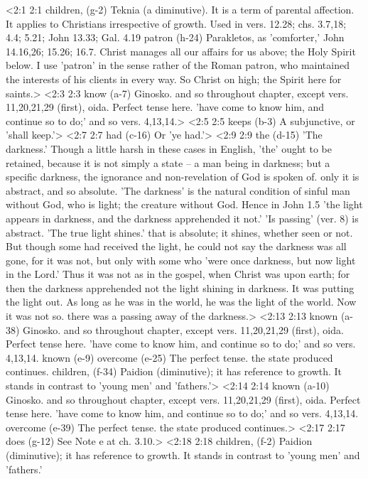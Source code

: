 <2:1 2:1  children, (g-2)  Teknia (a diminutive). It is a term of parental affection.  It applies to Christians irrespective of growth. Used in vers.  12.28; chs. 3.7,18; 4.4; 5.21; John 13.33; Gal. 4.19
  patron (h-24)  Parakletos, as 'comforter,' John 14.16,26; 15.26; 16.7.  Christ manages all our affairs for us above; the Holy Spirit  below. I use 'patron' in the sense rather of the Roman patron,  who maintained the interests of his clients in every way. So  Christ on high; the Spirit here for saints.>
<2:3 2:3  know (a-7)  Ginosko. and so throughout chapter, except vers.  11,20,21,29 (first), oida. Perfect tense here. 'have come to  know him, and continue so to do;' and so vers. 4,13,14.>
<2:5 2:5  keeps (b-3)  A subjunctive, or 'shall keep.'>
<2:7 2:7  had (c-16)  Or 'ye had.'>
<2:9 2:9  the (d-15)  'The darkness.' Though a little harsh in these cases in  English, 'the' ought to be retained, because it is not simply a  state -- a man being in darkness; but a specific darkness, the  ignorance and non-revelation of God is spoken of. only it is  abstract, and so absolute. 'The darkness' is the natural  condition of sinful man without God, who is light; the creature  without God. Hence in John 1.5 'the light appears in darkness,  and the darkness apprehended it not.' 'Is passing' (ver. 8) is  abstract. 'The true light shines.' that is absolute; it shines,  whether seen or not. But though some had received the light, he  could not say the darkness was all gone, for it was not, but  only with some who 'were once darkness, but now light in the  Lord.' Thus it was not as in the gospel, when Christ was upon  earth; for then the darkness apprehended not the light shining  in darkness. It was putting the light out. As long as he was in  the world, he was the light of the world. Now it was not so.  there was a passing away of the darkness.>
<2:13 2:13  known (a-38)  Ginosko. and so throughout chapter, except vers.  11,20,21,29 (first), oida. Perfect tense here. 'have come to  know him, and continue so to do;' and so vers. 4,13,14.
  known (e-9)  overcome (e-25) The perfect tense. the state produced continues.
  children, (f-34)  Paidion (diminutive); it has reference to growth. It stands  in contrast to 'young men' and 'fathers.'>
<2:14 2:14  known (a-10)  Ginosko. and so throughout chapter, except vers.  11,20,21,29 (first), oida. Perfect tense here. 'have come to  know him, and continue so to do;' and so vers. 4,13,14.
  overcome (e-39)  The perfect tense. the state produced continues.>
<2:17 2:17  does (g-12)  See Note e at ch. 3.10.>
<2:18 2:18  children, (f-2)  Paidion (diminutive); it has reference to growth. It stands  in contrast to 'young men' and 'fathers.'
